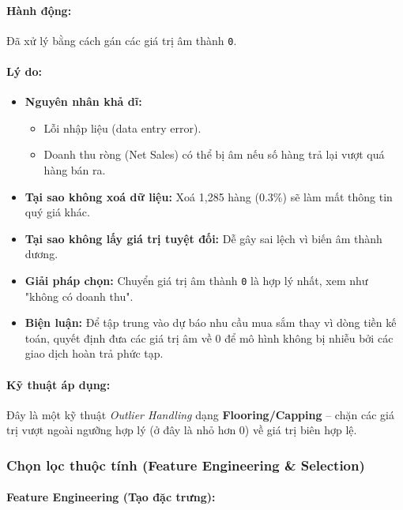 \paragraph{Hành động:} 
Đã xử lý bằng cách gán các giá trị âm thành \texttt{0}.

\paragraph{Lý do:}
\begin{itemize}
    \item \textbf{Nguyên nhân khả dĩ:}
    \begin{itemize}
        \item Lỗi nhập liệu (data entry error).
        \item Doanh thu ròng (Net Sales) có thể bị âm nếu số hàng trả lại vượt quá hàng bán ra.
    \end{itemize}
    \item \textbf{Tại sao không xoá dữ liệu:} Xoá 1,285 hàng (0.3\%) sẽ làm mất thông tin quý giá khác. 
    \item \textbf{Tại sao không lấy giá trị tuyệt đối:} Dễ gây sai lệch vì biến âm thành dương. 
    \item \textbf{Giải pháp chọn:} Chuyển giá trị âm thành \texttt{0} là hợp lý nhất, xem như "không có doanh thu". 
    \item \textbf{Biện luận:} Để tập trung vào dự báo nhu cầu mua sắm thay vì dòng tiền kế toán, quyết định đưa các giá trị âm về 0 để mô hình không bị nhiễu bởi các giao dịch hoàn trả phức tạp.
\end{itemize}

\paragraph{Kỹ thuật áp dụng:} 
Đây là một kỹ thuật \textit{Outlier Handling} dạng \textbf{Flooring/Capping} – chặn các giá trị vượt ngoài ngưỡng hợp lý (ở đây là nhỏ hơn 0) về giá trị biên hợp lệ.

\subsubsection{Chọn lọc thuộc tính (Feature Engineering \& Selection)}

\paragraph{Feature Engineering (Tạo đặc trưng):}

